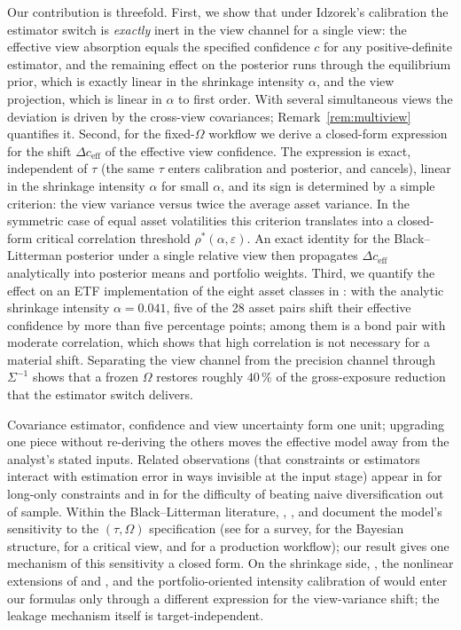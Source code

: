 \documentclass[a4paper,11pt]{article}
\theoremstyle{plain}
\theoremstyle{definition}
\newcommand{\eff}{\mathrm{eff}}
\begin{document}
Our contribution is threefold. First, we show that under Idzorek's
calibration the estimator switch is \emph{exactly} inert in the view
channel for a single view: the effective view absorption equals the
specified confidence $c$ for any positive-definite estimator, and the
remaining effect on the posterior runs through the equilibrium prior,
which is exactly linear in the shrinkage intensity $\alpha$, and the
view projection, which is linear in $\alpha$ to first order. With several
simultaneous views the deviation is driven by the cross-view covariances;
Remark~\ref{rem:multiview} quantifies it. Second, for the fixed-$\Omega$
workflow we derive a closed-form expression for the shift
$\Delta c_{\eff}$ of the effective view confidence. The expression is
exact, independent of $\tau$ (the same $\tau$ enters calibration and
posterior, and cancels), linear in the shrinkage intensity $\alpha$ for
small $\alpha$, and its sign is determined by a simple criterion: the view variance versus twice the
average asset variance. In the symmetric case of equal asset volatilities
this criterion translates into a closed-form critical correlation
threshold $\rho^*(\alpha, \varepsilon)$. An exact identity for the
Black--Litterman posterior under a single relative view then propagates
$\Delta c_{\eff}$ analytically into posterior means and portfolio
weights. Third, we quantify the effect on an ETF implementation of the
eight asset classes in \citet{Idzorek2007}: with the analytic shrinkage
intensity $\alpha = 0.041$, five of the 28 asset pairs shift their
effective confidence by more than five percentage points; among them is
a bond pair with moderate correlation, which shows that high correlation
is not necessary for a material shift. Separating the view channel from
the precision channel through $\Sigma^{-1}$ shows that a frozen
$\Omega$ restores roughly $40\,\%$ of the gross-exposure reduction that
the estimator switch delivers.

Covariance
estimator, confidence and view uncertainty form one unit; upgrading one
piece without re-deriving the others moves the effective model away from
the analyst's stated inputs. Related observations (that constraints or
estimators interact with estimation error in ways invisible at the input
stage) appear in \citet{JagannathanMa2003} for long-only constraints and
in \citet{DeMiguelGarlappiUppal2009} for the difficulty of beating naive
diversification out of sample. Within the Black--Litterman literature,
\citet{HeLitterman1999}, \citet{SatchellScowcroft2000},
\citet{Herold2003} and \citet{Walters2014} document the model's
sensitivity to the $(\tau, \Omega)$ specification (see
\citealp{Meucci2010} for a survey, \citealp{KolmRitter2017} for the
Bayesian structure, \citealp{MichaudEschMichaud2013} for a critical
view, and \citealp{BevanWinkelmann1998} for a production workflow); our
result gives one mechanism of this sensitivity a closed form. On the
shrinkage side, \citet{LedoitWolf2003}, the nonlinear extensions of
\citet{LedoitWolf2017} and \citet{LedoitWolf2020}, and the
portfolio-oriented intensity calibration of
\citet{DeMiguelMartinUtreraNogales2013} would enter our formulas only
through a different expression for the view-variance shift; the leakage
mechanism itself is target-independent.
\end{document}
